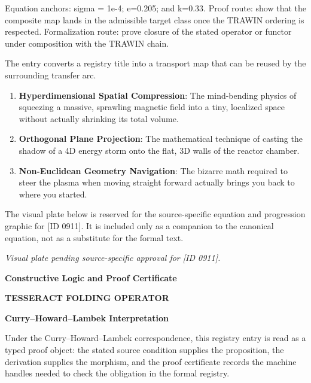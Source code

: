 Equation anchors: sigma = 1e-4; e=0.205; and k=0.33. Proof route: show that the composite map lands in the admissible target class once the TRAWIN ordering is respected. Formalization route: prove closure of the stated operator or functor under composition with the TRAWIN chain.

The entry converts a registry title into a transport map that can be reused by the surrounding transfer arc.
\endgroup

\begin{enumerate}[leftmargin=1.6em,itemsep=6pt,topsep=4pt]
\item \textbf{Hyperdimensional Spatial Compression}: The mind-bending physics of squeezing a massive, sprawling magnetic field into a tiny, localized space without actually shrinking its total volume.
\item \textbf{Orthogonal Plane Projection}: The mathematical technique of casting the shadow of a 4D energy storm onto the flat, 3D walls of the reactor chamber.
\item \textbf{Non-Euclidean Geometry Navigation}: The bizarre math required to steer the plasma when moving straight forward actually brings you back to where you started.
\end{enumerate}

\begingroup\footnotesize\sloppy
The visual plate below is reserved for the source-specific equation and progression graphic for [ID 0911]. It is included only as a companion to the canonical equation, not as a substitute for the formal text.
\par\endgroup
\begingroup\footnotesize\itshape
Visual plate pending source-specific approval for [ID 0911].
\par\endgroup

\clearpage
\begingroup\tzpsupportsetup
\noindent\textbf{\fontsize{10.8pt}{12.8pt}\selectfont [ID 0911] Constructive Logic and Proof Certificate}\par
\noindent\textbf{\fontsize{10pt}{12pt}\selectfont TESSERACT FOLDING OPERATOR}\par
\vspace{0.45em}
\begingroup
\footnotesize
\setlength{\parskip}{0.22em}
\setlength{\parindent}{0pt}
\noindent\textbf{Curry--Howard--Lambek Interpretation}\par
Under the Curry--Howard--Lambek correspondence, this registry entry is read as a typed proof
object: the stated source condition supplies the proposition, the derivation supplies the
morphism, and the proof certificate records the machine handles needed to check the obligation
in the formal registry.

